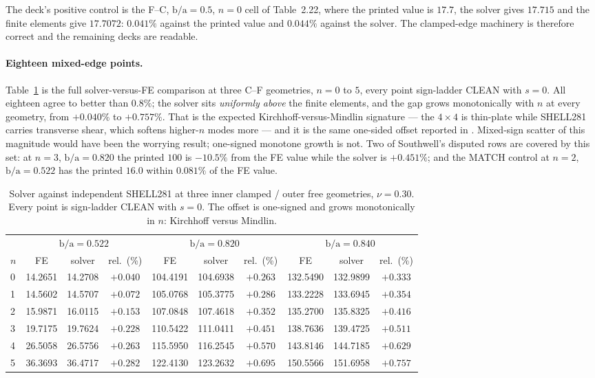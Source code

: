\documentclass[11pt]{article}
\newcommand{\ba}{\mbox{b/a}}
\begin{document}
The deck's positive control is the F--C, $\ba=0.5$, $n=0$ cell of Table~2.22,
where the printed value is $17.7$, the solver gives $17.715$ and the finite
elements give $17.7072$: $0.041\%$ against the printed value and $0.044\%$
against the solver. The clamped-edge machinery is therefore correct and the
remaining decks are readable.

\paragraph{Eighteen mixed-edge points.}
Table~\ref{tab:fe18} is the full solver-versus-FE comparison at three C--F
geometries, $n=0$ to $5$, every point sign-ladder CLEAN with $s=0$. All
eighteen agree to better than $0.8\%$; the solver sits \emph{uniformly above}
the finite elements, and the gap grows monotonically with $n$ at every
geometry, from $+0.040\%$ to $+0.757\%$. That is the expected
Kirchhoff-versus-Mindlin signature --- the $4\times4$ is thin-plate while
SHELL281 carries transverse shear, which softens higher-$n$ modes more --- and
it is the same one-sided offset reported in \cite{mccune2026annular}.
Mixed-sign scatter of this magnitude would have been the worrying result;
one-signed monotone growth is not. Two of Southwell's disputed rows are
covered by this set: at $n=3$, $\ba=0.820$ the printed $100$ is $-10.5\%$ from
the FE value while the solver is $+0.451\%$; and the MATCH control at $n=2$,
$\ba=0.522$ has the printed $16.0$ within $0.081\%$ of the FE value.

\begin{table}[htbp]\centering\small
\caption{Solver against independent SHELL281 \cite{ansys} at three inner
clamped / outer free geometries, $\nu=0.30$. Every point is sign-ladder CLEAN
with $s=0$. The offset is one-signed and grows monotonically in $n$:
Kirchhoff versus Mindlin.}
\label{tab:fe18}
\begin{tabular}{lccccccccc}
\toprule
& \multicolumn{3}{c}{$\ba=0.522$} & \multicolumn{3}{c}{$\ba=0.820$}
& \multicolumn{3}{c}{$\ba=0.840$}\\
\cmidrule(lr){2-4}\cmidrule(lr){5-7}\cmidrule(lr){8-10}
$n$ & FE & solver & rel.\ (\%) & FE & solver & rel.\ (\%)
& FE & solver & rel.\ (\%)\\
\midrule
0 & 14.2651 & 14.2708 & $+0.040$ & 104.4191 & 104.6938 & $+0.263$ & 132.5490 & 132.9899 & $+0.333$ \\
1 & 14.5602 & 14.5707 & $+0.072$ & 105.0768 & 105.3775 & $+0.286$ & 133.2228 & 133.6945 & $+0.354$ \\
2 & 15.9871 & 16.0115 & $+0.153$ & 107.0848 & 107.4618 & $+0.352$ & 135.2700 & 135.8325 & $+0.416$ \\
3 & 19.7175 & 19.7624 & $+0.228$ & 110.5422 & 111.0411 & $+0.451$ & 138.7636 & 139.4725 & $+0.511$ \\
4 & 26.5058 & 26.5756 & $+0.263$ & 115.5950 & 116.2545 & $+0.570$ & 143.8146 & 144.7185 & $+0.629$ \\
5 & 36.3693 & 36.4717 & $+0.282$ & 122.4130 & 123.2632 & $+0.695$ & 150.5566 & 151.6958 & $+0.757$ \\
\bottomrule
\end{tabular}
\end{table}
\end{document}
